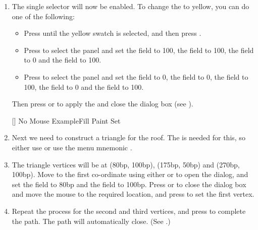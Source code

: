 \begin{enumerate}
\item The single  selector will now be enabled. To change the
 to yellow, you can do one of the following:
\begin{itemize}
\item Press  until the yellow swatch
is selected, and then press .

\item Press  to select the
 panel and set the
 field to 100, the
 field to 100, the
 field to 0 and the
 field to 100.

\item Press  to select the
 panel and set the
 field to 0, the
 field to 0, the
 field to 100, the
 field to 0 and the
 field to 100.
\end{itemize}
Then press  or  to apply the
 and close the dialog box (see ).

[]
{}
{No Mouse Example\dash Fill Paint Set}

\item Next we need to construct a triangle for the roof. The
 is needed for this, so either use
 or use the menu mnemonic
.

\item The triangle vertices will be at (80bp, 100bp), (175bp, 50bp)
and (270bp, 100bp). Move to the first co-ordinate using either
 or  to open the
 dialog, and set the  field to
80bp and the  field to 100bp. 
Press  or  to
close the  dialog box and move the mouse to the required location,
and press  to set the first vertex.

\item Repeat the process for the second and third vertices, and press
 to complete the path. The path will automatically close.
(See .)


\end{enumerate}
